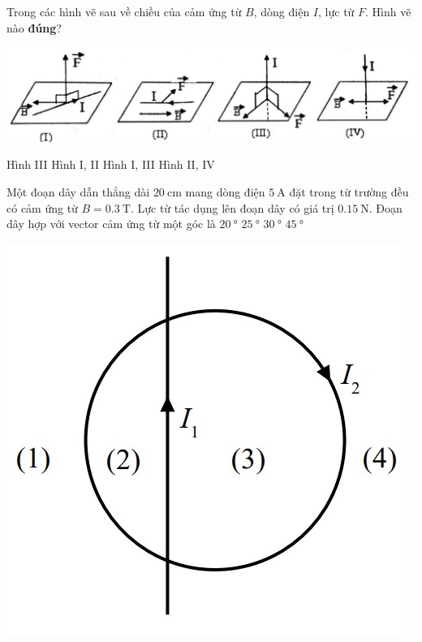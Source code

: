 \begin{ex}
	Trong các hình vẽ sau về chiều của cảm ứng từ $B$, dòng điện $I$, lực từ $F$. Hình vẽ nào \textbf{đúng}?
	\begin{center}
		\includegraphics[width=0.7\linewidth]{figs/VN12-Y24-PH-SYL-025P-1}
	\end{center}
	\choice
	{Hình III}
	{Hình I, II}
	{\True Hình I, III}
	{Hình II, IV}
	\loigiai{}
\end{ex}
\begin{ex}
	Một đoạn dây dẫn thẳng dài $\SI{20}{\centi\meter}$ mang dòng điện $\SI{5}{\ampere}$ đặt trong từ trường đều có cảm ứng từ $B=\SI{0.3}{\tesla}$. Lực từ tác dụng lên đoạn dây có giá trị $\SI{0.15}{\newton}$. Đoạn dây hợp với vector cảm ứng từ một góc là
	\choice
	{$\SI{20}{\degree}$}
	{$\SI{25}{\degree}$}
	{\True $\SI{30}{\degree}$}
	{$\SI{45}{\degree}$}
\end{ex}
\begin{ex}
	{\includegraphics[scale=0.4]{figs/VN12-Y24-PH-SYL-025P-2}}
	\loigiai{}
\end{ex}
